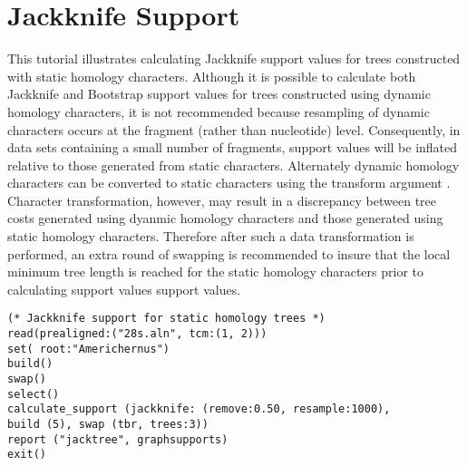 \section{Jackknife Support}{\label{tutorial 4}}

This tutorial illustrates calculating Jackknife support values for trees constructed with static homology characters.  Although it is possible to calculate both Jackknife and Bootstrap support values 
for trees constructed using dynamic homology characters, it is not recommended because resampling of dynamic characters occurs at the fragment (rather than nucleotide) level.  Consequently, in data sets containing a small number of fragments, support values will be inflated relative to those generated from static characters.  Alternately dynamic homology characters can be converted to static characters using the transform argument .  Character transformation, however, may result in a discrepancy between tree costs generated using dyanmic homology characters and those generated using static homology characters.  Therefore after such a data transformation is performed, an extra round of swapping is recommended to insure that the local minimum tree length is reached for the static homology characters prior to calculating support values  support values.

 \begin{verbatim}
(* Jackknife support for static homology trees *)
read(prealigned:("28s.aln", tcm:(1, 2)))
set( root:"Americhernus")
build()
swap()
select()
calculate_support (jackknife: (remove:0.50, resample:1000), 
build (5), swap (tbr, trees:3))
report ("jacktree", graphsupports)
exit()
\end{verbatim}

